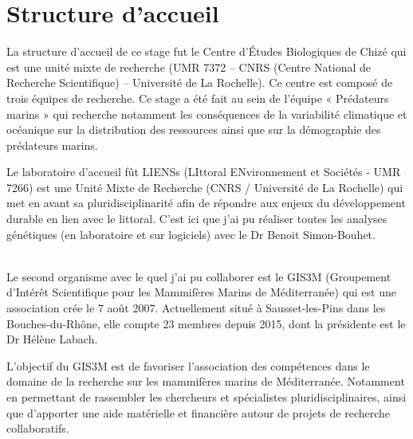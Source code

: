 \documentclass[a4paper,12pt,twoside]{article}\usepackage[]{graphicx}\usepackage[]{color}
\begin{document}
\newpage
\mainmatter

\tableofcontents


\newpage
\listoffigures  %
\listoftables   %

\newpage


 \setcounter{page}{1}

\part*{Structure d'accueil}


La structure d'accueil de ce stage fut le Centre d’Études Biologiques de Chizé qui est une unité mixte de recherche (UMR 7372 – CNRS (Centre National de Recherche Scientifique) – Université de La Rochelle). Ce centre est composé de trois équipes de recherche. Ce stage a été fait au sein de l’équipe « Prédateurs marins » qui recherche notamment les conséquences de la variabilité climatique et océanique sur la distribution des ressources ainsi que sur la démographie des prédateurs marins.

Le laboratoire d'accueil fût LIENSs (LIttoral ENvironnement et Sociétés - UMR 7266) est une Unité Mixte de Recherche (CNRS / Université de La Rochelle) qui met en avant sa pluridisciplinarité afin de répondre aux enjeux du développement durable en lien avec le littoral. C'est ici que j'ai pu réaliser toutes les analyses génétiques (en laboratoire et sur logiciels) avec le Dr Benoit Simon-Bouhet.

~~\\

Le second organisme avec le quel j'ai pu collaborer est le GIS3M (Groupement d’Intérêt Scientifique pour les Mammifères Marins de Méditerranée) qui est une association crée le 7 août 2007. Actuellement situé à Sausset-les-Pins dans les Bouches-du-Rhône, elle compte 23 membres depuis 2015, dont la présidente est le Dr Hélène Labach.

L’objectif du GIS3M est de favoriser l'association des compétences dans le domaine de la recherche sur les mammifères marins de Méditerranée. Notamment en permettant de rassembler les chercheurs et spécialistes pluridisciplinaires, ainsi que d'apporter une aide matérielle et financière autour de projets de recherche collaboratifs.
\end{document}
